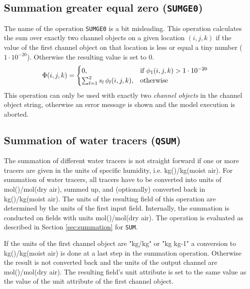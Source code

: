 \documentclass[twoside]{article}
\begin{document}
\subsection{Summation greater equal zero ({\tt SUMGE0})}
\label{sec:summation_ge0}
%
The name of the operation {\tt SUMGE0} is a bit misleading.
This operation calculates the sum over exactly two channel objects on a given location $(i,j,k)$ if the value of the first channel object on that location is less or equal a tiny number ($1\cdot10^{-20}$).
Otherwise the resulting value is set to $0$.
%
\begin{equation}
\Phi(i,j,k) =
\begin{cases}
  0,                        &\text{if } \phi_1(i,j,k) > 1\cdot10^{-20}\\
  \sum_{l=1}^2s_l\,\phi_l(i,j,k), &\text{otherwise}
\end{cases}\\
\end{equation}
%
This operation can only be used with exactly two {\it channel objects} in the channel object string, otherwise an error message is shown and the model execution is aborted.
%
\subsection{Summation of water tracers ({\tt QSUM})}
\label{sec:summation_qsum}
%
The summation of different water tracers is not straight forward if one or more tracers are given in the units of specific humidity, i.e. kg()/kg(moist air).
For summation of water tracers, all tracers have to be converted into units of mol()/mol(dry air), summed up, and (optionally) converted back in kg()/kg(moist air).
The units of the resulting field of this operation are determined by the units of the first input field.
Internally, the summation is conducted on fields with units mol()/mol(dry air).
The operation is evaluated as described in Section \ref{sec:summation} for {\tt SUM}.

If the units of the first channel object are "kg/kg" or "kg kg-1" a conversion to kg()/kg(moist air) is done at a last step in the summation operation.
Otherwise the result is not converted back and the units of the output channel are mol()/mol(dry air).
The resulting field's unit attribute is set to the same value as the value of the unit attribute of the first channel object.
\end{document}
